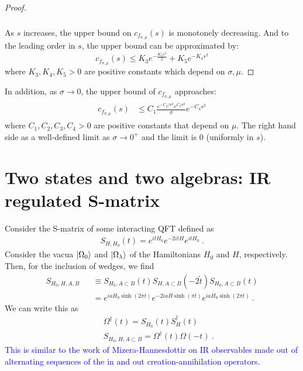 \documentclass[a4paper,11pt]{article}
\theoremstyle{definition}
\newcommand{\nn}{\nonumber}
\newcommand{\NL}[1]{\textcolor{blue}{#1}}
\begin{document}
\begin{proof}
\begin{align}
\begin{split}
        \end{split}
    \end{align}
    As $s$ increases, the upper bound on $c_{f_{\sigma,\mu}}(s)$ is monotonely decreasing. And to the leading order in $s$, the upper bound can be approximated by:
    \begin{equation}
        c_{f_{\sigma,\mu}}(s) \leq K_3e^{-\frac{K_4 s^2}{2}} + K_5e^{-K_4 s^2}
    \end{equation}
    where $K_3, K_4, K_5 > 0$ are positive constants which depend on $\sigma, \mu$. 
\end{proof}
In addition, as $\sigma \rightarrow 0$, the upper bound of $c_{f_{\sigma, \mu}}$ approaches:
\begin{align}
    \begin{split}
        c_{f_{\sigma,\mu}}(s) &\leq C_1 \frac{e^{-C_2/\sigma^2}e^{C_3\sigma^2}}{\sigma}e^{-C_4s^2}
    \end{split}
\end{align}
where $C_1,C_2,C_3, C_4 > 0$ are positive constants that depend on $\mu$. The right hand side as a well-defined limit as $\sigma\rightarrow 0^+$ and the limit is $0$ (uniformly in $s$).

\section{Two states and two algebras: IR regulated S-matrix}

Consider the S-matrix of some interacting QFT defined as
\begin{eqnarray}
S_{H,H_0}(t)=e^{i t H_0}e^{-2i t H}e^{it H_0}\ .
\end{eqnarray}
Consider the vacua $\ket{\Omega_0}$ and $\ket{\Omega_\lambda}$ of the Hamiltonians $H_0$ and $H$, respectively. Then, for the inclusion of wedges, we find
\begin{eqnarray}
S_{H_0,H,A,B}&&\equiv S_{H_0,A\subset B}(t) S_{H,A\subset B}(-2\tilde{t})S_{H_0,A\subset B}(t)\nn\\
&&=e^{i a H_0 \sinh(2\pi t)} e^{-2i a H \sinh(\pi t)}e^{i a H_0 \sinh(2\pi t)}\ .
\end{eqnarray}
We can write this as 
\begin{eqnarray}
    &&\Omega^\dagger(t)=S_{H_0}(t) S^\dagger_{H}(t)\nn\\
    &&S_{H_0,H,A\subset B}=\Omega^\dagger(t) \Omega(-t)\ .
\end{eqnarray}
\NL{This is similar to the work of Mizera-Hannesdottir on IR observables made out of alternating sequences of the in and out creation-annihilation operators.}
\end{document}
